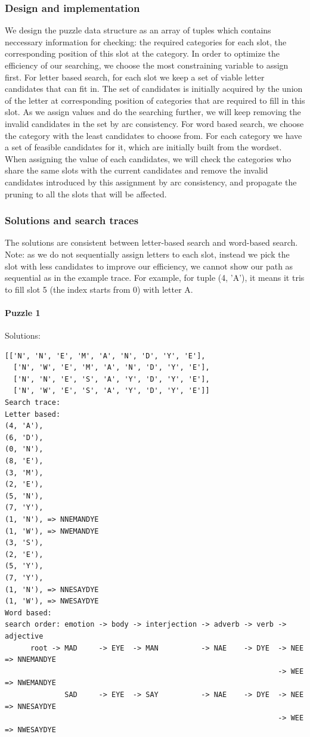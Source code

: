 \subsubsection*{Design and implementation}
We design the puzzle data structure as an array of tuples which contains neccessary information for checking: the required categories for each slot, the corresponding position of this slot at the category. In order to optimize the efficiency of our searching, we choose the most constraining variable to assign first.
For letter based search, for each slot we keep a set of viable letter candidates that can fit in. The set of candidates is initially acquired by the union of the letter at corresponding position of categories that are required to fill in this slot. As we assign values and do the searching further, we will keep removing the invalid candidates in the set by arc consistency.
For word based search, we choose the category with the least candidates to choose from. For each category we have a set of feasible candidates for it, which are initially built from the wordset. When assigning the value of each candidates, we will check the categories who share the same slots with the current candidates and remove the invalid candidates introduced by this assignment by arc consistency, and propagate the pruning to all the slots that will be affected.
\subsubsection*{Solutions and search traces}
The solutions are consistent between letter-based search and word-based search.\\
Note: as we do not sequentially assign letters to each slot, instead we pick the slot with less candidates to improve our efficiency, we cannot show our path as sequential as in the example trace. For example, for tuple (4, 'A'), it means it tris to fill slot 5 (the index starts from 0) with letter A.
\paragraph{Puzzle 1}
Solutions:\\
\begin{verbatim}
[['N', 'N', 'E', 'M', 'A', 'N', 'D', 'Y', 'E'],
  ['N', 'W', 'E', 'M', 'A', 'N', 'D', 'Y', 'E'],
  ['N', 'N', 'E', 'S', 'A', 'Y', 'D', 'Y', 'E'],
  ['N', 'W', 'E', 'S', 'A', 'Y', 'D', 'Y', 'E']]
Search trace:
Letter based:
(4, 'A'),
(6, 'D'),
(0, 'N'),
(8, 'E'),
(3, 'M'),
(2, 'E'),
(5, 'N'),
(7, 'Y'),
(1, 'N'), => NNEMANDYE
(1, 'W'), => NWEMANDYE
(3, 'S'),
(2, 'E'),
(5, 'Y'),
(7, 'Y'),
(1, 'N'), => NNESAYDYE
(1, 'W'), => NWESAYDYE
Word based:
search order: emotion -> body -> interjection -> adverb -> verb -> adjective
      root -> MAD     -> EYE  -> MAN          -> NAE    -> DYE  -> NEE       => NNEMANDYE
                                                                -> WEE       => NWEMANDYE
              SAD     -> EYE  -> SAY          -> NAE    -> DYE  -> NEE       => NNESAYDYE
                                                                -> WEE       => NWESAYDYE
\end{verbatim}
